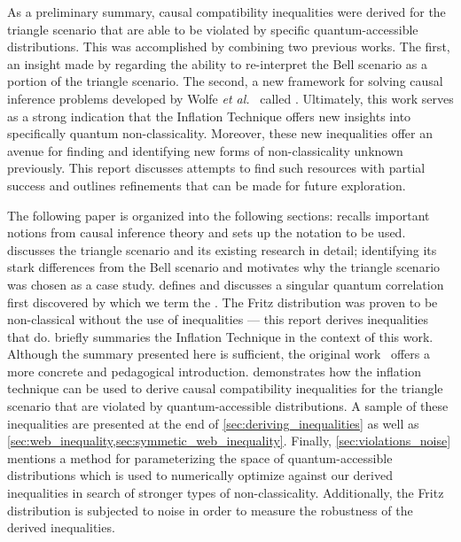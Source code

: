 \documentclass[aps, 10pt, english, twoside, pra, nofootinbib, tightenlines, longbibliography]{revtex4-1}
\begin{document}
    As a preliminary summary, causal compatibility inequalities were derived for the triangle scenario that are able to be violated by specific quantum-accessible distributions. This was accomplished by combining two previous works. The first, an insight made by \citet{Fritz_2012} regarding the ability to re-interpret the Bell scenario as a portion of the triangle scenario. The second, a new framework for solving causal inference problems developed by Wolfe \emph{et al.}~\cite{Inflation} called . Ultimately, this work serves as a strong indication that the Inflation Technique offers new insights into specifically quantum non-classicality. Moreover, these new inequalities offer an avenue for finding and identifying new forms of non-classicality unknown previously. This report discusses attempts to find such resources with partial success and outlines refinements that can be made for future exploration.

    The following paper is organized into the following sections:  recalls important notions from causal inference theory and sets up the notation to be used.  discusses the triangle scenario and its existing research in detail; identifying its stark differences from the Bell scenario and motivates why the triangle scenario was chosen as a case study.  defines and discusses a singular quantum correlation first discovered by \citet{Fritz_2012} which we term the . The Fritz distribution was proven to be non-classical without the use of inequalities --- this report derives inequalities that do.  briefly summaries the Inflation Technique in the context of this work. Although the summary presented here is sufficient, the original work~\cite{Inflation} offers a more concrete and pedagogical introduction.  demonstrates how the inflation technique can be used to derive causal compatibility inequalities for the triangle scenario that are violated by quantum-accessible distributions. A sample of these inequalities are presented at the end of \cref{sec:deriving_inequalities} as well as \cref{sec:web_inequality,sec:symmetic_web_inequality}. Finally, \cref{sec:violations_noise} mentions a method for parameterizing the space of quantum-accessible distributions which is used to numerically optimize against our derived inequalities in search of stronger types of non-classicality. Additionally, the Fritz distribution is subjected to noise in order to measure the robustness of the derived inequalities.
\end{document}

